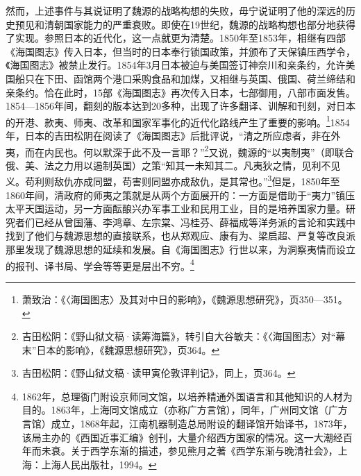 \documentclass[a4paper, 12pt, openright]{ctexbook}
\begin{document}
然而，上述事件与其说证明了魏源的战略构想的失败，毋宁说证明了他的深远的历史预见和清朝国家能力的严重衰败。即使在19世纪，魏源的战略构想也部分地获得了实现。参照日本的近代化，这一点就更为清楚。1850年至1853年，相继有四部《海国图志》传入日本，但当时的日本奉行锁国政策，并颁布了天保镇压西学令，《海国图志》被禁止发行。1854年3月日本被迫与美国签订神奈川和亲条约，允许美国船只在下田、函馆两个港口采购食品和加煤，又相继与英国、俄国、荷兰缔结和亲条约。恰在此时，15部《海国图志》再次传入日本，七部御用，八部市面发售。1854—1856年间，翻刻的版本达到20多种，出现了许多翻译、训解和刊刻，对日本的开港、款夷、师夷、改革和国家军事化的近代化路线产生了重要的影响。\footnote{萧致治：《〈海国图志〉及其对中日的影响》，《魏源思想研究》，页350—351。}1854年，日本的吉田松阴在阅读了《海国图志》后批评说，“清之所应虑者，非在外夷，而在内民也。何以默深于此不及一言耶？”\footnote{吉田松阴：《野山狱文稿·读筹海篇》，转引自大谷敏夫：《〈海国图志〉对“幕末”日本的影响》，《魏源思想研究》，页364。}又说，魏源的“以夷制夷”（即联合俄、美、法之力用以遏制英国）之策“知其一未知其二。凡夷狄之情，见利不见义。苟利则敌仇亦成同盟，苟害则同盟亦成敌仇，是其常也。”\footnote{吉田松阴：《野山狱文稿·读甲寅伦敦评判记》，同上，页364。}但是，1850年至1860年间，清政府的师夷之策就是从两个方面展开的：一方面是借助于“夷力”镇压太平天国运动，另一方面酝酿兴办军事工业和民用工业，目的是培养国家力量。研究者们已经从曾国藩、李鸿章、左宗棠、冯桂芬、薛福成等洋务派的言论和实践中找到了他们与魏源思想的直接联系，也从郑观应、康有为、梁启超、严复等改良派那里发现了魏源思想的延续和发展。自《海国图志》行世以来，为洞察夷情而设立的报刊、译书局、学会等等更是层出不穷。\footnote{1862年，总理衙门附设京师同文馆，以培养精通外国语言和其他知识的人材为目的。1863年，上海同文馆成立（亦称广方言馆），同年，广州同文馆（广方言馆）成立，1868年起，江南机器制造总局附设的翻译馆开始译书，1873年，该局主办的《西国近事汇编》创刊，大量介绍西方国家的情况。这一大潮经百年而未衰。关于西学东渐的描述，参见熊月之著《西学东渐与晚清社会》，上海：上海人民出版社，1994。}
\end{document}
